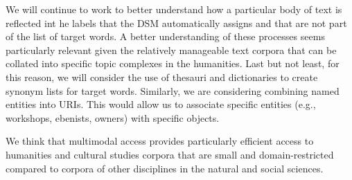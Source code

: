 We will continue to work to better understand how a particular body of text is reflected int he labels that the DSM automatically assigns and that are not part of the list of target words. A better understanding of these processes seems particularly relevant given the relatively manageable text corpora that can be collated into specific topic complexes in the humanities. Last but not least, for this reason, we will consider the use of thesauri and dictionaries to create synonym lists for target words. Similarly, we are considering combining named entities into URIs. This would allow us to associate specific entities (e.g., workshops, ebenists, owners) with specific objects.

We think that multimodal access provides particularly efficient access to humanities and cultural studies corpora that are small and domain-restricted compared to corpora of other disciplines in the natural and social sciences.
